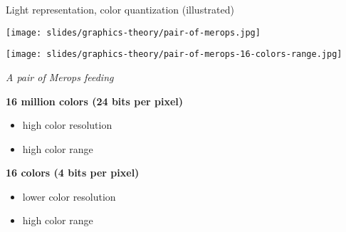 \begin{frame}{Light representation, color quantization (illustrated)}
  \begin{minipage}[b]{0.45\textwidth}
    \centering
    \texttt{[image: slides/graphics-theory/pair-of-merops.jpg]}
  \end{minipage}
  \hfill
  \begin{minipage}[b]{0.45\textwidth}
    \centering
    \texttt{[image: slides/graphics-theory/pair-of-merops-16-colors-range.jpg]}
  \end{minipage}

  \begin{center}
     \textit{\small A pair of Merops feeding}
  \end{center}

  \begin{minipage}[b]{0.45\textwidth}
    \centering
    \textbf{16 million colors (24 bits per pixel)}
    \begin{itemize}
    \item high color resolution
    \item high color range
    \end{itemize}
  \end{minipage}
  \hfill
  \begin{minipage}[b]{0.45\textwidth}
    \centering
    \textbf{16 colors (4 bits per pixel)}
    \begin{itemize}
    \item lower color resolution
    \item high color range
    \end{itemize}
  \end{minipage}
\end{frame}

